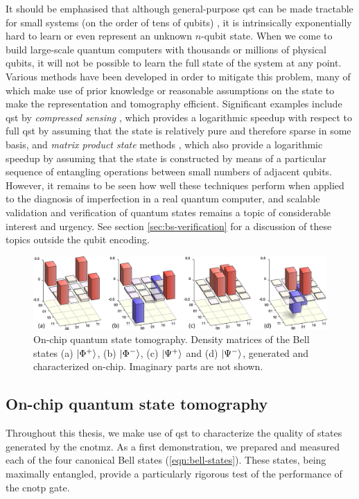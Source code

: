 It should be emphasised that although general-purpose \gls{qst} can be made tractable for small systems (on the order of tens of qubits) \cite{Gao2008}, it is intrinsically exponentially hard to learn or even represent an unknown $n$-qubit state. When we come to build large-scale quantum computers with thousands or millions of physical qubits, it will not be possible to learn the full state of the system at any point. Various methods have been developed in order to mitigate this problem, many of which make use of prior knowledge or reasonable assumptions on the state to make the representation and tomography efficient. Significant examples include \gls{qst} by \emph{compressed sensing} \cite{Gross2010}, which provides a logarithmic speedup with respect to full \gls{qst} by assuming that the state is relatively pure and therefore sparse in some basis, and \emph{matrix product state} methods \cite{Cramer2010}, which also provide a logarithmic speedup by assuming that the state is constructed by means of a particular sequence of entangling operations between small numbers of adjacent qubits.
However, it remains to be seen how well these techniques perform  when applied to the diagnosis of imperfection in a real quantum computer, and scalable validation and verification of quantum states remains a topic of considerable interest and urgency. See section \ref{sec:bs-verification} for a discussion of these topics outside the qubit encoding.

\begin{figure}[t!]
\centering
\includegraphics[width=1.0\linewidth]{chapter3/fig/4.jpg}
\caption[On-chip quantum state tomography]{
On-chip quantum state tomography.  
Density matrices of the Bell states (a) $\mbox{$ | \Phi^{+} \rangle $}$, (b) $\mbox{$ | \Phi^{-} \rangle $}$, (c) $\mbox{$ | \Psi^{+} \rangle $}$ and (d) $\mbox{$ | \Psi^{-} \rangle $}$,  generated and characterized on-chip. Imaginary parts are not shown. }
\label{fig:bells}
\end{figure}

\subsection{On-chip quantum state tomography}
\label{sec:cnot-mz-tomography-experiment}
Throughout this thesis, we make use of \gls{qst} to characterize the quality of states generated by the \gls{cnotmz}. As a first demonstration, we prepared and measured each of the four canonical Bell states (\ref{eqn:bell-states}). These states, being maximally entangled, provide a particularly rigorous test of the performance of the \gls{cnotp} gate.

